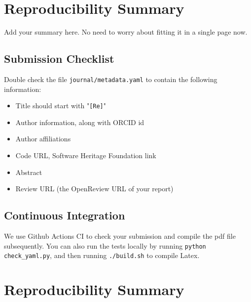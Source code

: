 \section{Reproducibility Summary}

Add your summary here. No need to worry about fitting it in a single page now.

\subsection{Submission Checklist}

Double check the file \texttt{journal/metadata.yaml} to contain the following information:

\begin{itemize}
\item Title should start with "\texttt{[Re]}"
\item Author information, along with ORCID id
\item Author affiliations
\item Code URL, Software Heritage Foundation link
\item Abstract
\item Review URL (the OpenReview URL of your report)
\end{itemize}

\subsection{Continuous Integration}

We use Github Actions CI to check your submission and compile the pdf file subsequently.
You can also run the tests locally by running \texttt{python check\_yaml.py}, and then running \texttt{./build.sh} to compile Latex.

\clearpage

\section*{\centering Reproducibility Summary}


